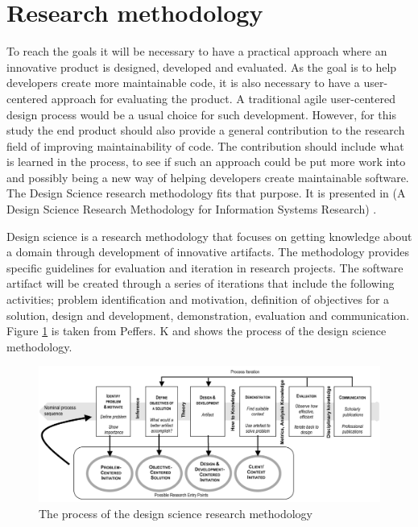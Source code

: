 \documentclass{report}
\begin{document}
\section{Research methodology}
To reach the goals it will be necessary to have a practical approach where an innovative product is designed, developed and evaluated. As the goal is to help developers create more maintainable code, it is also necessary to have a user-centered approach for evaluating the product. A traditional agile user-centered design process would be a usual choice for such development. However, for this study the end product should also provide a general contribution to the research field of improving maintainability of code. The contribution should include what is learned in the process, to see if such an approach could be put more work into and possibly being a new way of helping developers create maintainable software. The Design Science research methodology fits that purpose. It is presented in (A Design Science Research Methodology for Information Systems Research) \cite{Peffers2007ADS}.

Design science is a research methodology that focuses on getting knowledge about a domain through development of innovative artifacts. The methodology provides specific guidelines for evaluation and iteration in research projects. The software artifact will be created through a series of iterations that include the following activities; problem identification and motivation, definition of objectives for a solution, design and development, demonstration, evaluation and communication. Figure \ref{fig:designScience} is taken from Peffers. K \cite{Peffers2007ADS} and shows the process of the design science methodology. 

\begin{figure}[h!]
    \centering
    \includegraphics[width=\textwidth]{report/images/designScience.png}
    \caption{The process of the design science research methodology}
    \label{fig:designScience}
\end{figure}
\end{document}
